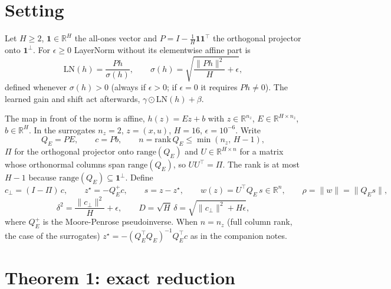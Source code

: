 \documentclass[11pt]{article}
\theoremstyle{plainnote}
\newcommand{\R}{\mathbb R}
\newcommand{\one}{\mathbf 1}
\newcommand{\cp}{c_\perp}
\begin{document}
\section{Setting}\label{sec:setting}

Let $H\ge2$, $\one\in\R^H$ the all-ones vector and $P=I-\frac1H\one\one^\top$ the orthogonal projector onto $\one^\perp$. For $\epsilon\ge0$ LayerNorm without its elementwise affine part is
\begin{equation}
\mathrm{LN}(h)=\frac{Ph}{\sigma(h)},\qquad \sigma(h)=\sqrt{\frac{\|Ph\|^2}{H}+\epsilon},
\label{eq:ln}
\end{equation}
defined whenever $\sigma(h)>0$ (always if $\epsilon>0$; if $\epsilon=0$ it requires $Ph\neq0$). The learned gain and shift act afterwards, $\gamma\odot\mathrm{LN}(h)+\beta$.

The map in front of the norm is affine, $h(z)=Ez+b$ with $z\in\R^{n_z}$, $E\in\R^{H\times n_z}$, $b\in\R^H$. In the surrogates $n_z=2$, $z=(x,u)$, $H=16$, $\epsilon=10^{-6}$. Write
\begin{equation}
Q_E=PE,\qquad c=Pb,\qquad n=\mathrm{rank}\,Q_E\le\min(n_z,\,H-1),
\end{equation}
$\Pi$ for the orthogonal projector onto $\mathrm{range}(Q_E)$ and $U\in\R^{H\times n}$ for a matrix whose orthonormal columns span $\mathrm{range}(Q_E)$, so $UU^\top=\Pi$. The rank is at most $H-1$ because $\mathrm{range}(Q_E)\subseteq\one^\perp$. Define
\begin{equation}
\cp=(I-\Pi)\,c,\qquad z^\star=-Q_E^{+}c,\qquad s=z-z^\star,\qquad w(z)=U^\top Q_E\,s\in\R^n,\qquad \rho=\|w\|=\|Q_E s\|,
\end{equation}
\begin{equation}
\delta^2=\frac{\|\cp\|^2}{H}+\epsilon,\qquad D=\sqrt H\,\delta=\sqrt{\|\cp\|^2+H\epsilon},
\end{equation}
where $Q_E^+$ is the Moore-Penrose pseudoinverse. When $n=n_z$ (full column rank, the case of the surrogates) $z^\star=-(Q_E^\top Q_E)^{-1}Q_E^\top c$ as in the companion notes.

\section{Theorem 1: exact reduction}\label{sec:thm1}
\end{document}
